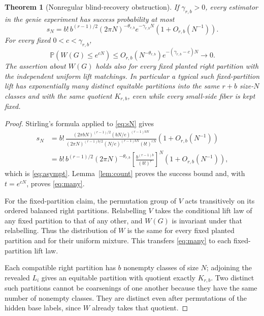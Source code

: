 \documentclass[11pt]{article}
\newtheorem{theorem}{Theorem}
\newcommand{\Prob}{\mathbb P}
\begin{document}
\begin{theorem}[Nonregular blind-recovery obstruction]\label{thm:main}
If $\gamma_{r,b}>0$, every estimator in the genie experiment has
success probability at most
\begin{equation}\label{eq:asympt}
 s_N=b!\,b^{(r-1)/2}(2\pi N)^{-\theta_{r,b}}
            e^{-\gamma_{r,b}N}(1+O_{r,b}(N^{-1})).
\end{equation}
For every fixed $0<c<\gamma_{r,b}$,
\begin{equation}\label{eq:many}
 \Prob(W(G)\le e^{cN})
 \le O_{r,b}(N^{-\theta_{r,b}})
                 e^{-(\gamma_{r,b}-c)N}\longrightarrow0.
\end{equation}
The assertion about $W(G)$ holds also for every \emph{fixed}
planted right partition with the independent uniform lift matchings.
In particular a typical such fixed-partition lift has exponentially
many distinct equitable partitions into the same $r+b$ size-$N$
classes and with the same quotient $K_{r,b}$, even while every
small-side fiber is kept fixed.
\end{theorem}
\begin{proof}
Stirling's formula applied to \eqref{eq:sN} gives
\begin{align*}
 s_N&=b!\,
  \frac{(2\pi bN)^{(r-1)/2}(bN/e)^{(r-1)bN}}
       {(2\pi N)^{(r-1)b/2}(N/e)^{(r-1)bN}(b!)^{rN}}
            (1+O_{r,b}(N^{-1}))\\
 &=b!\,b^{(r-1)/2}(2\pi N)^{-\theta_{r,b}}
      \left[\frac{b^{(r-1)b}}{(b!)^r}\right]^N
            (1+O_{r,b}(N^{-1})),
\end{align*}
which is \eqref{eq:asympt}. Lemma~\ref{lem:count} proves the
success bound and, with $t=e^{cN}$, proves \eqref{eq:many}.

For the fixed-partition claim, the permutation group of $V$ acts
transitively on its ordered balanced right partitions. Relabelling
$V$ takes the conditional lift law of any fixed partition to that
of any other, and $W(G)$ is invariant under that relabelling.
Thus the distribution of $W$ is the same for every fixed planted
partition and for their uniform mixture. This transfers
\eqref{eq:many} to each fixed-partition lift law.

Each compatible right partition has $b$ nonempty classes of size
$N$; adjoining the revealed $L_i$ gives an equitable partition with
quotient exactly $K_{r,b}$. Two distinct such partitions cannot be
coarsenings of one another because they have the same number of
nonempty classes. They are distinct even after permutations of
the hidden base labels, since $W$ already takes that quotient.
\end{proof}
\end{document}
